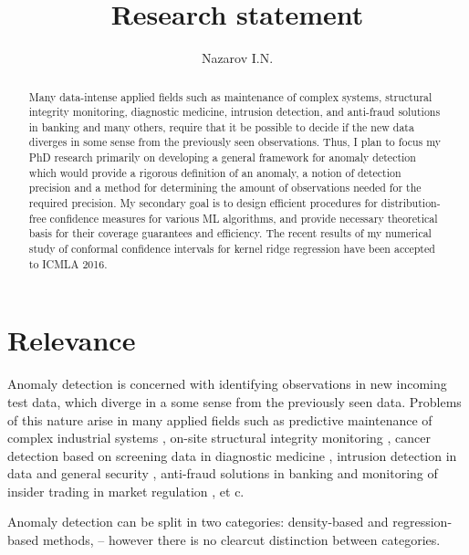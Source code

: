 \documentclass{extarticle}
\title{Research statement}
\author{Nazarov I.N.}
\begin{document}
\maketitle
\begin{abstract}
Many data-intense applied fields such as maintenance of complex systems, structural
integrity monitoring, diagnostic medicine, intrusion detection, and anti-fraud solutions
in banking and many others, require that it be possible to decide if the new data
diverges in some sense from the previously seen observations. Thus, I plan to focus
my PhD research primarily on developing a general framework for anomaly detection
which would provide a rigorous definition of an anomaly, a notion of detection precision
and a method for determining the amount of observations needed for the required precision.
My secondary goal is to design efficient procedures for distribution-free confidence
measures for various ML algorithms, and provide necessary theoretical basis for
their coverage guarantees and efficiency. The recent results of my numerical study
of conformal confidence intervals for kernel ridge regression have been accepted
to ICMLA 2016.
\end{abstract}

\section{Relevance} %
\label{sec:relevance}

Anomaly detection is concerned with identifying observations in new incoming test
data, which diverge in a some sense from the previously seen data. Problems of this
nature arise in many applied fields such as predictive maintenance of complex industrial
systems \cite{tarassenko2009}, on-site structural integrity monitoring \cite{surace2010},
cancer detection based on screening data in diagnostic medicine \cite{tarassenko1995,quinn2007,clifton2011},
intrusion detection in data and general security \cite{jyothsna2011}, anti-fraud
solutions in banking and monitoring of insider trading in market regulation \cite{patcha2007},
et c.

Anomaly detection can be split in two categories: density-based and regression-based
methods, -- however there is no clearcut distinction between categories.
\end{document}
